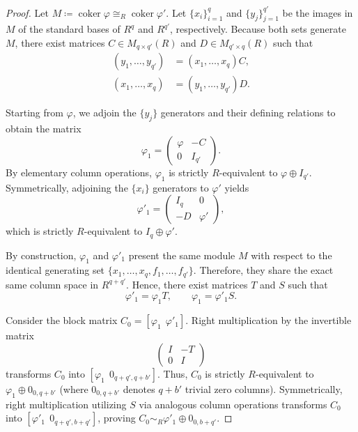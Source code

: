 \documentclass[aps,prx,english,superscriptaddress,twocolumn,tightenlines,showpacs,longbibliography,floatfix,amsfonts]{revtex4-2}
\theoremstyle{remark}
\theoremstyle{definition}
\begin{document}
\begin{proof}
	Let $M \coloneqq \operatorname{coker}\varphi \cong_R \operatorname{coker}\varphi'$. Let $\{x_i\}_{i=1}^q$ and $\{y_j\}_{j=1}^{q'}$ be the images in $M$ of the standard bases of $R^q$ and $R^{q'}$, respectively. Because both sets generate $M$, there exist matrices $C \in M_{q \times q'}(R)$ and $D \in M_{q' \times q}(R)$ such that
	\begin{equation}
		\begin{split}
			(y_1,\dots,y_{q'}) &= (x_1,\dots,x_q)C, \\
			(x_1,\dots,x_q) &= (y_1,\dots,y_{q'})D.
		\end{split}
	\end{equation}

	Starting from $\varphi$, we adjoin the $\{y_j\}$ generators and their defining relations to obtain the matrix
	\begin{equation}
		\varphi_1 =
		\begin{pmatrix}
			\varphi & -C\\
			0 & I_{q'}
		\end{pmatrix}.
	\end{equation}
	By elementary column operations, $\varphi_1$ is strictly \(R\)-equivalent to $\varphi \oplus I_{q'}$. Symmetrically, adjoining the $\{x_i\}$ generators to $\varphi'$ yields
	\begin{equation}
		\varphi'_1 =
		\begin{pmatrix}
			I_q & 0\\
			-D & \varphi'
		\end{pmatrix},
	\end{equation}
	which is strictly \(R\)-equivalent to $I_q \oplus \varphi'$.

	By construction, $\varphi_1$ and $\varphi'_1$ present the same module $M$ with respect to the identical generating set $\{x_1,\dots,x_q, f_1,\dots,f_{q'}\}$. Therefore, they share the exact same column space in $R^{q+q'}$. Hence, there exist matrices $T$ and $S$ such that
	\begin{equation}
		\varphi'_1 = \varphi_1 T, \qquad \varphi_1 = \varphi'_1 S.
	\end{equation}

	Consider the block matrix $C_0 = [\varphi_1 \ \ \varphi'_1]$. Right multiplication by the invertible matrix
	\begin{equation}
		\begin{pmatrix}
			I & -T \\
			0 & I
		\end{pmatrix}
	\end{equation}
	transforms $C_0$ into $[\varphi_1 \ \ 0_{q+q', q+b'}]$. Thus, $C_0$ is strictly \(R\)-equivalent to $\varphi_1 \oplus 0_{0, q+b'}$ (where $0_{0, q+b'}$ denotes $q+b'$ trivial zero columns). Symmetrically, right multiplication utilizing $S$ via analogous column operations transforms $C_0$ into $[\varphi'_1 \ \ 0_{q+q', b+q'}]$, proving $C_0 \sim_R \varphi'_1 \oplus 0_{0, b+q'}$.


\end{proof}
\end{document}
